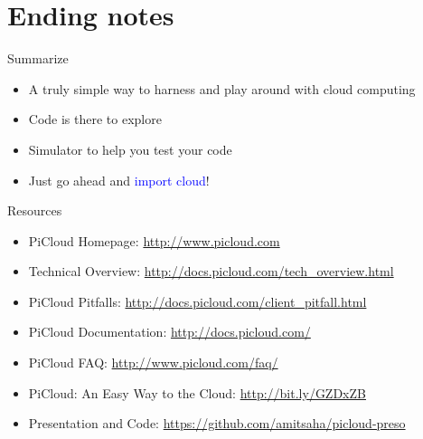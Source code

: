 \documentclass{beamer} \usepackage{fancyvrb} \usepackage{listings}
\begin{document}
    \section{Ending notes}

    \begin{frame}{Summarize}
      \begin{itemize}
      \item A truly simple way to harness and play around with cloud
        computing
      \item Code is there to explore
      \item Simulator to help you test your code
      \item Just go ahead and \textcolor{blue}{import cloud}!
      \end{itemize}

    \end{frame}
    
    \begin{frame}{Resources}
      \begin{itemize}
      \item PiCloud Homepage: \url{http://www.picloud.com}
      \item Technical Overview: \url{http://docs.picloud.com/tech_overview.html}
      \item PiCloud Pitfalls:
        \url{http://docs.picloud.com/client_pitfall.html}
      \item PiCloud Documentation: \url{http://docs.picloud.com/}
      \item PiCloud FAQ: \url{http://www.picloud.com/faq/}
      \item PiCloud: An Easy Way to the Cloud:
        \url{http://bit.ly/GZDxZB}
      \item Presentation and Code:
        \url{https://github.com/amitsaha/picloud-preso}
      \end{itemize}
    \end{frame}

    
\end{document}
